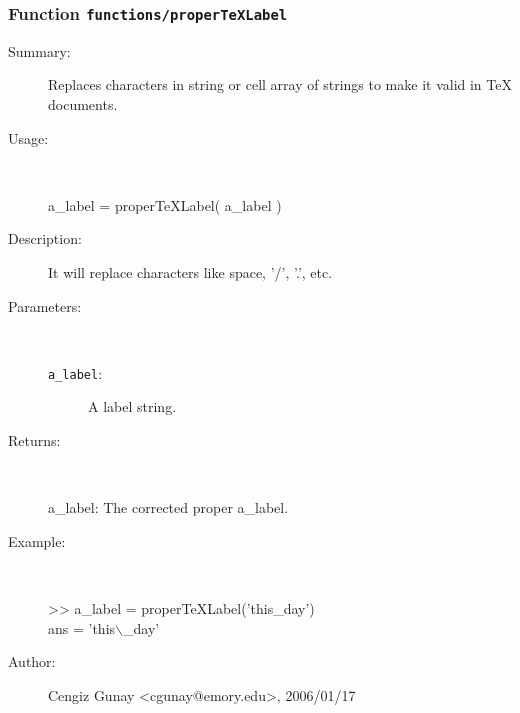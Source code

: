 \subsubsection[Function \texttt{properTeXLabel}]{Function \texttt{functions/properTeXLabel}}%
%
\label{ref_functions__properTeXLabel}%
\hypertarget{ref_functions__properTeXLabel}{}%
\begin{description}
\item[Summary:]Replaces characters in string or cell array of strings to make it valid in TeX documents.
%
\item[Usage:]~%
\begin{lyxcode}%
a\_label = properTeXLabel( a\_label )
%
\end{lyxcode}%
%
\item[Description:]%
It will replace characters like space, '/', '.', etc.
\item[Parameters:]~
\begin{description}%
\item[\texttt{a\_label}:]
 A label string.
\end{description}%
%
\item[Returns:
]~

 	a\_label: The corrected proper a\_label.
%
\item[Example:]~
\begin{lyxcode} >> a\_label = properTeXLabel('this\_day')
\\%
 ans = 'this$\backslash$\_day' 
\\%
\end{lyxcode}
%
%
\item[Author:]%
Cengiz Gunay <cgunay@emory.edu>, 2006/01/17
%
\end{description}
\methodline%
